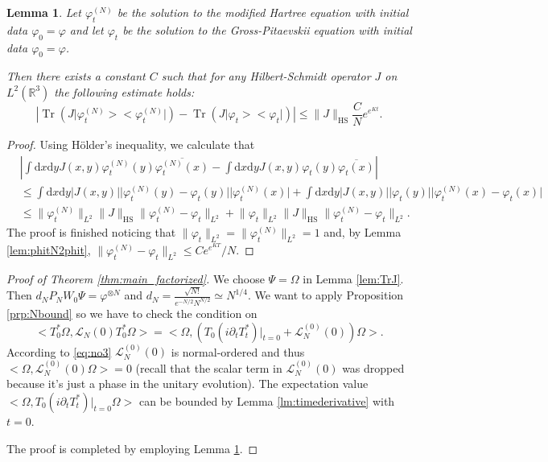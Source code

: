 \documentclass[11pt,a4paper,draft,DIV11]{scrartcl}	%
\newtheorem{lem}[thm]{Lemma}
\newcommand{\di}{\textrm{d}}		%
\newcommand{\Lcal}{\mathcal{L}}		%
\newcommand{\Ncal}{\mathcal{N}}		%
\newcommand{\scal}[2]{\big<#1,#2\big>} %
\newcommand{\cc}[1]{\overline{#1}}	%
\newcommand{\Rbb}{\mathbb{R}}		%
\newcommand{\norm}[1]{\lVert#1\rVert}	%
\newcommand{\ph}{\varphi_t^{(N)}}	%
\newcommand{\project}[1]{\lvert #1 \big>\big< #1\rvert}	%
\newcommand{\Tr}{\operatorname{Tr}}	%
\newcommand{\bd}{\begin{displaymath}}			%
\newcommand{\ed}{\end{displaymath}}
\begin{document}
\begin{lem}
\label{lem:phNtoph}
Let $\ph$ be the solution to the modified Hartree equation with initial data $\varphi_0 = \varphi$ and let $\varphi_t$ be the solution to the Gross-Pitaevskii equation with initial data $\varphi_0 = \varphi$.

Then there exists a constant $C$ such that for any Hilbert-Schmidt operator $J$ on $L^2(\Rbb^3)$ the following estimate holds:
\bd
\left\lvert \Tr\left(J \project{\ph}\right) - \Tr\left(J \project{\varphi_t}\right) \right\rvert \leq \norm{J}_{\textrm{HS}} \frac{C}{N} e^{e^{Kt}}.
\ed
\end{lem}
\begin{proof}
Using H\"older's inequality, we calculate that
\begin{align*}
& \left\lvert \int \di x \di y J(x,y) \ph(y) \cc{\ph(x)} - \int \di x\di y J(x,y) \varphi_t(y) \cc{\varphi_t(x)} \right\rvert \\ 
& \leq \int \di x \di y \lvert J(x,y)\rvert \lvert \ph(y) - \varphi_t(y)\rvert \lvert \ph(x)\rvert + \int \di x \di y \lvert J(x,y) \rvert \lvert \varphi_t(y)\rvert \lvert \ph(x)-\varphi_t(x)\rvert \\
& \leq \norm{\ph}_{L^2} \norm{J}_{\textrm{HS}} \norm{\ph - \varphi_t}_{L^2} + \norm{\varphi_t}_{L^2} \norm{J}_{\textrm{HS}} \norm{\ph - \varphi_t}_{L^2}. 
\end{align*}
The proof is finished noticing that $\norm{\varphi_t}_{L^2} = \norm{\ph}_{L^2} = 1$ and, by Lemma \ref{lem:phitN2phit}, $\norm{\ph - \varphi_t}_{L^2} \leq C e^{e^{KT}}/N$.
\end{proof}

\begin{proof}[Proof of Theorem \ref{thm:main_factorized}]
We choose $\Psi = \Omega$ in Lemma \ref{lem:TrJ}. Then $d_N P_N W_0 \Psi = \varphi^{\otimes N}$ and $d_N = \frac{\sqrt{N!}}{e^{-N/2}N^{N/2}} \simeq N^{1/4}$.
We want to apply Proposition \ref{prp:Nbound} %
so we have to check the condition on 
\bd
\scal{T^\ast_0 \Omega}{\Lcal_N(0)T^\ast_0 \Omega} = \scal{\Omega}{\left(T_0(i\partial_t T^\ast_t)\rvert_{t=0} + \Lcal_N^{(0)}(0)\right)\Omega}.
\ed
According to \eqref{eq:no3} $\Lcal_N^{(0)}(0)$ is normal-ordered and thus $\scal{\Omega}{\Lcal_N^{(0)}(0)\Omega} = 0$ (recall that the scalar term in $\Lcal_N^{(0)}(0)$ was dropped because it's just  a phase in the unitary evolution). The expectation value $\scal{\Omega}{T_0(i\partial_t T^\ast_t)\rvert_{t=0} \Omega}$ can be bounded by Lemma \ref{lm:timederivative} with $t=0$.

The proof is completed by employing Lemma \ref{lem:phNtoph}.
\end{proof}
\end{document}
